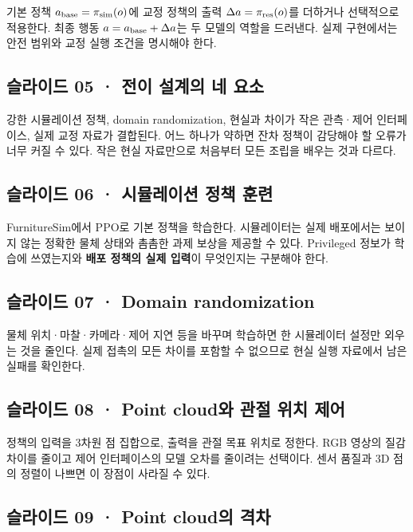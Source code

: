 \documentclass[11pt,a4paper]{article}
\begin{document}
기본 정책 $a_{\rm base}=\pi_{\rm sim}(o)$에 교정 정책의 출력 $\Delta a=\pi_{\rm res}(o)$를 더하거나 선택적으로 적용한다. 최종 행동 $a=a_{\rm base}+\Delta a$는 두 모델의 역할을 드러낸다. 실제 구현에서는 안전 범위와 교정 실행 조건을 명시해야 한다.\par

\subsection{슬라이드 05 · 전이 설계의 네 요소}

강한 시뮬레이션 정책, domain randomization, 현실과 차이가 작은 관측·제어 인터페이스, 실제 교정 자료가 결합된다. 어느 하나가 약하면 잔차 정책이 감당해야 할 오류가 너무 커질 수 있다. 작은 현실 자료만으로 처음부터 모든 조립을 배우는 것과 다르다.\par

\subsection{슬라이드 06 · 시뮬레이션 정책 훈련}

FurnitureSim에서 PPO로 기본 정책을 학습한다. 시뮬레이터는 실제 배포에서는 보이지 않는 정확한 물체 상태와 촘촘한 과제 보상을 제공할 수 있다. Privileged 정보가 학습에 쓰였는지와 \textbf{배포 정책의 실제 입력}이 무엇인지는 구분해야 한다.\par

\subsection{슬라이드 07 · Domain randomization}

물체 위치·마찰·카메라·제어 지연 등을 바꾸며 학습하면 한 시뮬레이터 설정만 외우는 것을 줄인다. 실제 접촉의 모든 차이를 포함할 수 없으므로 현실 실행 자료에서 남은 실패를 확인한다.\par

\subsection{슬라이드 08 · Point cloud와 관절 위치 제어}

정책의 입력을 3차원 점 집합으로, 출력을 관절 목표 위치로 정한다. RGB 영상의 질감 차이를 줄이고 제어 인터페이스의 모델 오차를 줄이려는 선택이다. 센서 품질과 3D 점의 정렬이 나쁘면 이 장점이 사라질 수 있다.\par

\subsection{슬라이드 09 · Point cloud의 격차}
\end{document}
